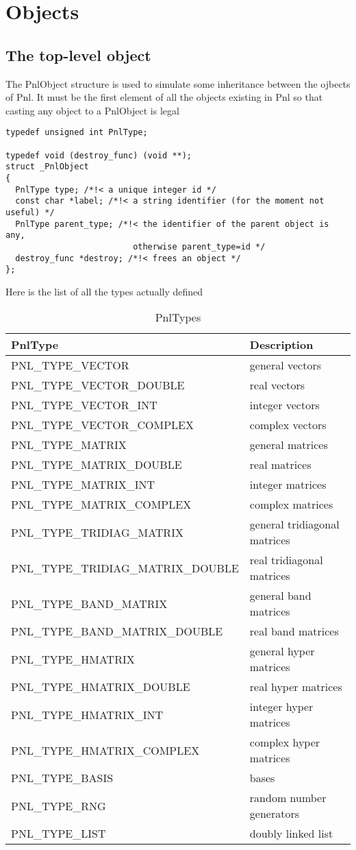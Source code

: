 \section{Objects}

\subsection{The top-level object}

The PnlObject structure is used to simulate some inheritance between the
ojbects of Pnl.  It must be the first element of all the objects existing in
Pnl so that casting any object to a PnlObject is legal

\begin{verbatim}
typedef unsigned int PnlType; 

typedef void (destroy_func) (void **);
struct _PnlObject
{
  PnlType type; /*!< a unique integer id */
  const char *label; /*!< a string identifier (for the moment not useful) */
  PnlType parent_type; /*!< the identifier of the parent object is any,
                          otherwise parent_type=id */
  destroy_func *destroy; /*!< frees an object */
};
\end{verbatim}

Here is the list of all the types actually defined
\begin{table}
  \centering
  \begin{tabular}{l|l}
    \hline
    PnlType & Description \\
    \hline
    PNL_TYPE_VECTOR & general vectors  \\
    PNL_TYPE_VECTOR_DOUBLE & real vectors \\
    PNL_TYPE_VECTOR_INT & integer vectors \\
    PNL_TYPE_VECTOR_COMPLEX & complex vectors \\
    PNL_TYPE_MATRIX & general matrices  \\
    PNL_TYPE_MATRIX_DOUBLE & real matrices \\
    PNL_TYPE_MATRIX_INT & integer matrices \\
    PNL_TYPE_MATRIX_COMPLEX & complex matrices \\
    PNL_TYPE_TRIDIAG_MATRIX & general tridiagonal matrices \\
    PNL_TYPE_TRIDIAG_MATRIX_DOUBLE & real  tridiagonal matrices \\
    PNL_TYPE_BAND_MATRIX & general band matrices \\
    PNL_TYPE_BAND_MATRIX_DOUBLE & real band matrices \\
    PNL_TYPE_HMATRIX & general hyper matrices \\
    PNL_TYPE_HMATRIX_DOUBLE & real hyper matrices \\
    PNL_TYPE_HMATRIX_INT & integer hyper matrices \\
    PNL_TYPE_HMATRIX_COMPLEX & complex hyper matrices \\
    PNL_TYPE_BASIS & bases \\
    PNL_TYPE_RNG & random number generators \\
    PNL_TYPE_LIST & doubly linked list
  \end{tabular}
  \caption{PnlTypes}
  \label{types}
\end{table}

